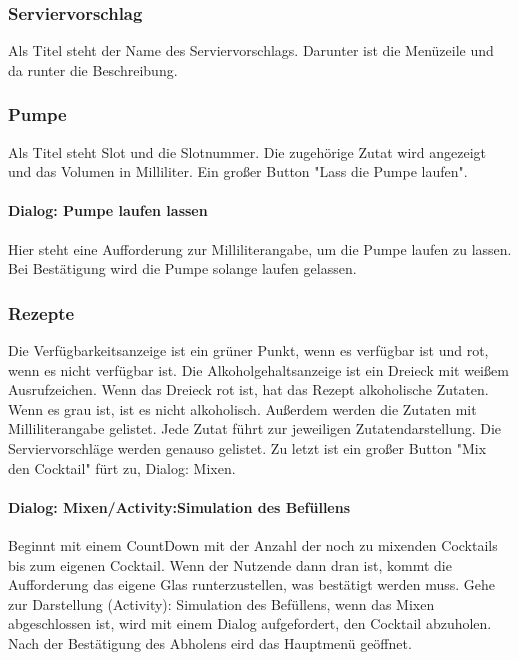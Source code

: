 \subsubsection{Serviervorschlag}

Als Titel steht der Name des Serviervorschlags. Darunter ist die Menüzeile und da runter die Beschreibung.

\subsubsection{Pumpe}

Als Titel steht Slot und die Slotnummer. Die zugehörige Zutat wird angezeigt und das Volumen in Milliliter. Ein großer Button "Lass die Pumpe laufen".

\paragraph{Dialog: Pumpe laufen lassen}

Hier steht eine Aufforderung zur Milliliterangabe, um die Pumpe laufen zu lassen. Bei Bestätigung wird die Pumpe solange laufen gelassen.

\subsubsection{Rezepte}

Die Verfügbarkeitsanzeige ist ein grüner Punkt, wenn es verfügbar ist und rot, wenn es nicht verfügbar ist. Die Alkoholgehaltsanzeige ist ein Dreieck mit weißem Ausrufzeichen. Wenn das Dreieck rot ist, hat das Rezept alkoholische Zutaten. Wenn es grau ist, ist es nicht alkoholisch. Außerdem werden die Zutaten mit Milliliterangabe gelistet. Jede Zutat führt zur jeweiligen Zutatendarstellung. Die Serviervorschläge werden genauso gelistet. Zu letzt ist ein großer Button "Mix den Cocktail" fürt zu, Dialog: Mixen.

\paragraph{Dialog: Mixen/Activity:Simulation des Befüllens}

Beginnt mit einem CountDown mit der Anzahl der noch zu mixenden Cocktails bis zum eigenen Cocktail. Wenn der Nutzende dann dran ist, kommt die Aufforderung das eigene Glas runterzustellen, was bestätigt werden muss. Gehe zur Darstellung (Activity): Simulation des Befüllens, wenn das Mixen abgeschlossen ist, wird mit einem Dialog aufgefordert, den Cocktail abzuholen. Nach der Bestätigung des Abholens eird das Hauptmenü geöffnet.



